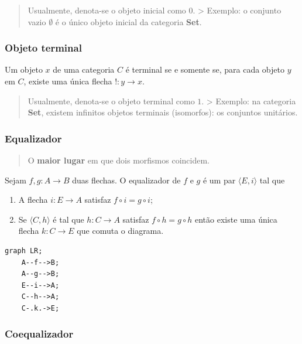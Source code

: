 \begin{quote}
Usualmente, denota-se o objeto inicial como \(0\). \textgreater{}
Exemplo: o conjunto vazio \(\emptyset\) é o único objeto inicial da
categoria \textbf{Set}.
\end{quote}

\hypertarget{objeto-terminal}{%
\subsubsection{Objeto terminal}\label{objeto-terminal}}

Um objeto \(x\) de uma categoria \(C\) é terminal se e somente se, para
cada objeto \(y\) em \(C\), existe uma única flecha
\(! : y \rightarrow x\).

\begin{quote}
Usualmente, denota-se o objeto terminal como \(1\). \textgreater{}
Exemplo: na categoria \textbf{Set}, existem infinitos objetos terminais
(isomorfos): os conjuntos unitários.
\end{quote}

\hypertarget{equalizador}{%
\subsubsection{Equalizador}\label{equalizador}}

\begin{quote}
O \textbf{maior lugar} em que dois morfismos coincidem.
\end{quote}

Sejam \(f, g : A \rightarrow B\) duas flechas. O equalizador de \(f\) e
\(g\) é um par \(\langle E, i \rangle\) tal que

\begin{enumerate}
\def\labelenumi{\arabic{enumi}.}
\tightlist
\item
  A flecha \(i : E \rightarrow A\) satisfaz \(f \circ i = g \circ i\);
\item
  Se \(\langle C , h \rangle\) é tal que \(h : C \rightarrow A\)
  satisfaz \(f \circ h = g \circ h\) então existe uma única flecha
  \(k : C \rightarrow E\) que comuta o diagrama.
\end{enumerate}

\begin{verbatim}
graph LR;
    A--f-->B;
    A--g-->B;
    E--i-->A;
    C--h-->A;
    C-.k.->E;
\end{verbatim}

\hypertarget{coequalizador}{%
\subsubsection{Coequalizador}\label{coequalizador}}

